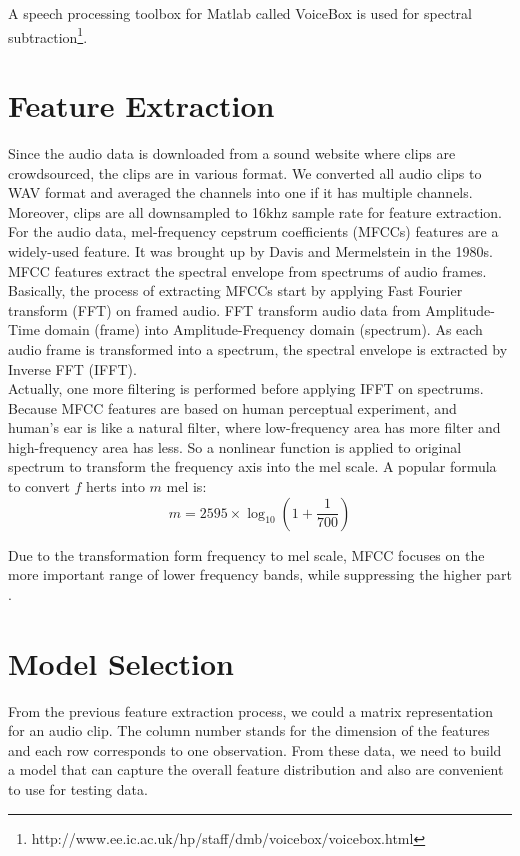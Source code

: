 A speech processing toolbox for Matlab called VoiceBox is used for spectral subtraction\footnote{http://www.ee.ic.ac.uk/hp/staff/dmb/voicebox/voicebox.html}.


\section{Feature Extraction}
Since the audio data is downloaded from a sound website where clips are crowdsourced, the clips are in various format. 
We converted all audio clips to WAV format and averaged the channels into one if it has multiple channels. 
Moreover, clips are all downsampled to 16khz sample rate for feature extraction.\\ 

For the audio data, mel-frequency cepstrum coefficients (MFCCs) features are a widely-used feature. 
It was brought up by Davis and Mermelstein in the 1980s. 
MFCC features extract the spectral envelope from spectrums of audio frames.
Basically, the process of extracting MFCCs start by applying Fast Fourier transform (FFT) on framed audio. 
FFT transform audio data from Amplitude-Time domain (frame) into Amplitude-Frequency domain (spectrum).  
As each audio frame is transformed into a spectrum, the spectral envelope is extracted by Inverse FFT (IFFT).\\ 

Actually, one more filtering is performed before applying IFFT on spectrums. 
Because MFCC features are based on human perceptual experiment, and human's ear is like a natural filter, where low-frequency area has more filter and high-frequency area has less. So a nonlinear function is applied to original spectrum to transform the frequency axis into the mel scale. 
A popular formula to convert $f$ herts into $m$ mel is: \\ 
\begin{equation}
	m = 2595 \times \log_{10}(1+\frac{1}{700})
\end{equation} 


Due to the transformation form frequency to mel scale, MFCC focuses on the more important range of lower frequency bands, while suppressing the higher part \cite{davis1980comparison}.

\section{Model Selection}
From the previous feature extraction process, we could a matrix representation for an audio clip. 
The column number stands for the dimension of the features and each row corresponds to one observation. 
From these data, we need to build a model that can capture the overall feature distribution and also are convenient to use for testing data.\\

